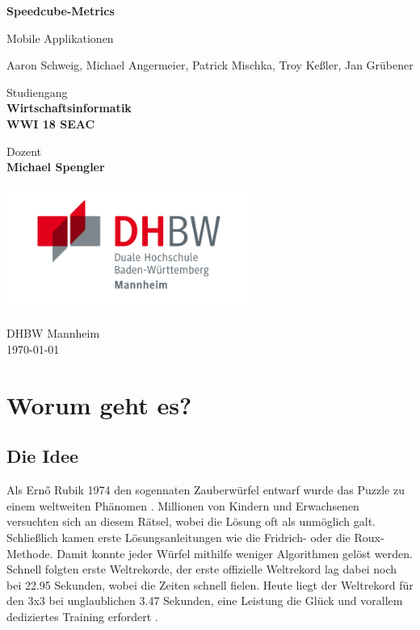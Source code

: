 \documentclass[a4paper]{article}
\theoremstyle{definition}
\begin{document}
\begin{titlepage}
	\begin{center}

		\Huge
		\textbf{Speedcube-Metrics}

		\vspace{0.5cm}
		\LARGE
		Mobile Applikationen

		\vspace{1.5cm}
		Aaron Schweig, Michael Angermeier, Patrick Mischka,
		Troy Keßler, Jan Grübener

		\vfill

		Studiengang\\
		\textbf{Wirtschaftsinformatik\\ WWI 18 SEAC}

		\vspace{0.8cm}

		Dozent\\
		\textbf{Michael Spengler}

		\vspace{0.8cm}

		\vspace{0.8cm}

		\includegraphics[width=0.6\textwidth]{img/dhbw.jpg}

		\Large
		DHBW Mannheim\\
		\today

	\end{center}
\end{titlepage}

\tableofcontents
\clearpage

\section{Worum geht es?}
\subsection{Die Idee}
Als Ernő Rubik 1974 den sogennaten Zauberwürfel entwarf wurde das Puzzle zu einem weltweiten Phänomen \cite{ernorubik}.
Millionen von Kindern und Erwachsenen versuchten sich an diesem Rätsel, wobei die Lösung oft als unmöglich
galt. Schließlich kamen erste Lösungsanleitungen wie die Fridrich- oder die Roux-Methode. Damit konnte jeder Würfel
mithilfe weniger Algorithmen gelöst werden. Schnell folgten erste Weltrekorde, der erste offizielle
Weltrekord lag dabei noch bei 22.95 Sekunden, wobei die Zeiten schnell fielen. Heute liegt der Weltrekord für den
3x3 bei unglaublichen 3.47 Sekunden, eine Leistung die Glück und vorallem dediziertes Training erfordert \cite{worldcubeassociation}.
\end{document}
